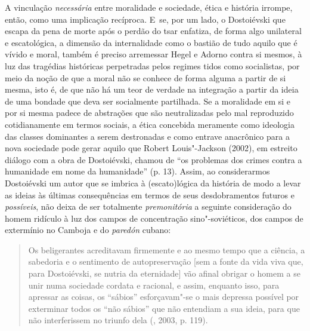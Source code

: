 A vinculação \emph{necessária} entre moralidade e sociedade, ética e
história irrompe, então, como uma implicação recíproca. E~se, por um
lado, o Dostoiévski que escapa da pena de morte após o perdão do tsar
enfatiza, de forma algo unilateral e escatológica, a dimensão da
internalidade como o bastião de tudo aquilo que é vívido e moral, também
é preciso arremessar Hegel e Adorno contra si mesmos, à luz das
tragédias históricas perpetradas pelos regimes tidos como socialistas,
por meio da noção de que a moral não se conhece de forma alguma a partir
de si mesma, isto é, de que não há um teor de verdade na integração a
partir da ideia de uma bondade que deva ser socialmente partilhada. Se a
moralidade em si e por si mesma padece de abstrações que são
neutralizadas pelo mal reproduzido cotidianamente em termos sociais, a
ética concebida meramente como ideologia das classes dominantes a serem
destronadas e como entrave anacrônico para a nova sociedade pode gerar
aquilo que Robert Louis"-Jackson (2002), em estreito diálogo com a obra
de Dostoiévski, chamou de ``os problemas dos crimes contra a humanidade
em nome da humanidade'' (p. 13). Assim, ao considerarmos Dostoiévski um
autor que se imbrica à (escato)lógica da história de modo a levar as
ideias às últimas consequências em termos de seus desdobramentos futuros
e \emph{possíveis}, não deixa de ser totalmente \emph{premonitória} a
seguinte consideração do homem ridículo à luz dos campos de concentração
sino"-soviéticos, dos campos de extermínio no Camboja e do \emph{paredón}
cubano:

\begin{quote}
Os beligerantes acreditavam firmemente e ao mesmo tempo que a ciência, a
sabedoria e o sentimento de autopreservação {[}sem a fonte da vida viva
que, para Dostoiévski, se nutria da eternidade{]} vão afinal obrigar o
homem a se unir numa sociedade cordata e racional, e assim, enquanto
isso, para apressar as coisas, os ``sábios'' esforçavam"-se o mais
depressa possível por exterminar todos os ``não sábios'' que não
entendiam a sua ideia, para que não interferissem no triunfo dela
(, 2003, p. 119).
\end{quote}


